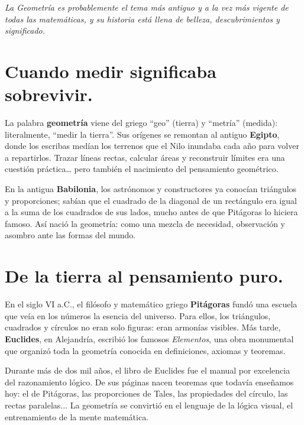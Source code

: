 
\vspace{0.5cm}

\begin{center}
\fontsize{12pt}{14.4pt}\selectfont\itshape
La Geometría es probablemente el tema más antiguo y a la vez más vigente de todas las matemáticas, 
y su historia está llena de belleza, descubrimientos y significado.
\end{center}

\vspace{1em}

\section*{Cuando medir significaba sobrevivir.}

\begin{reseñaplana}
La palabra \textbf{geometría} viene del griego “geo” (tierra) y “metría” (medida): literalmente, “medir la tierra”.  
Sus orígenes se remontan al antiguo \textbf{Egipto}, donde los escribas medían los terrenos que el Nilo 
inundaba cada año para volver a repartirlos.  
Trazar líneas rectas, calcular áreas y reconstruir límites era una cuestión práctica… pero también el 
nacimiento del pensamiento geométrico.  

En la antigua \textbf{Babilonia}, los astrónomos y constructores ya conocían triángulos y proporciones; 
sabían que el cuadrado de la diagonal de un rectángulo era igual a la suma de los cuadrados de sus lados, 
mucho antes de que Pitágoras lo hiciera famoso.  
Así nació la geometría: como una mezcla de necesidad, observación y asombro ante las formas del mundo.  
\end{reseñaplana}

\section*{De la tierra al pensamiento puro.}

\begin{reseñaplana}
En el siglo VI a.C., el filósofo y matemático griego \textbf{Pitágoras} fundó una escuela que veía 
en los números la esencia del universo.  
Para ellos, los triángulos, cuadrados y círculos no eran solo figuras: eran armonías visibles.  
Más tarde, \textbf{Euclides}, en Alejandría, escribió los famosos \textit{Elementos}, una obra monumental 
que organizó toda la geometría conocida en definiciones, axiomas y teoremas.  

Durante más de dos mil años, el libro de Euclides fue el manual por excelencia del razonamiento lógico.  
De sus páginas nacen teoremas que todavía enseñamos hoy: el de Pitágoras, las proporciones de Tales, 
las propiedades del círculo, las rectas paralelas...  
La geometría se convirtió en el lenguaje de la lógica visual, el entrenamiento de la mente matemática.  
\end{reseñaplana}


